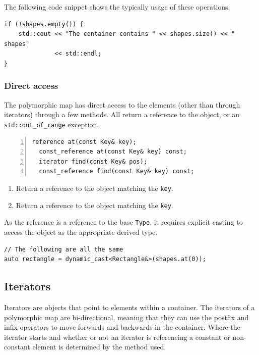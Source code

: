 \documentclass[10pt,a4paper,openany]{mudbook}
\newenvironment{enumeratedef}
  {\begin{enumerate}[topsep=0.5em,itemsep=0em,parsep=0em,font=\small]
     \small}
  {\end{enumerate}}
\begin{document}
The following code snippet shows the typically usage of these operations.

\begin{lstlisting}[style=snippet]
if (!shapes.empty()) {
    std::cout << "The container contains " << shapes.size() << " shapes"
              << std::endl;
}
\end{lstlisting}

\subsubsection{Direct access}

The polymorphic map has direct access to the elements (other than through
iterators) through a few methods. All return a reference to the object, or
an \texttt{std::out\_of\_range} exception.

\begin{lstlisting}[style=definition,numbers=left]
  reference at(const Key& key);
  const_reference at(const Key& key) const;
  iterator find(const Key& pos);
  const_reference find(const Key& key) const;
\end{lstlisting}
\begin{enumeratedef}
  \item[1-2] Return a reference to the object matching the \texttt{key}.
  \item[3-4] Return a reference to the object matching the \texttt{key}.
\end{enumeratedef}

As the reference is a reference to the base \texttt{Type}, it requires
explicit casting to access the object as the appropriate derived type.

\begin{lstlisting}[style=snippet]
// The following are all the same
auto rectangle = dynamic_cast<Rectangle&>(shapes.at(0));
\end{lstlisting}

\subsection{Iterators}

Iterators are objects that point to elements within a container. The iterators
of a polymorphic map are bi-directional, meaning that they can use the
postfix and infix operators to move forwards and backwards in the container.
Where the iterator starts and whether or not an iterator is referencing a
constant or non-constant element is determined by the method used.
\end{document}

